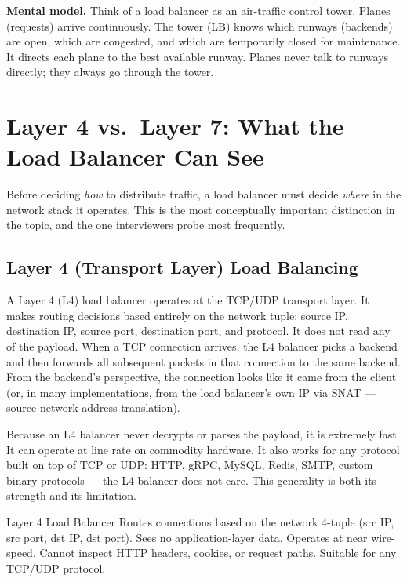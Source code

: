 \documentclass[11pt,a4paper]{article}
\begin{document}
\begin{insightbox}
  \textbf{Mental model.} Think of a load balancer as an air-traffic control tower. Planes
  (requests) arrive continuously. The tower (LB) knows which runways (backends) are open,
  which are congested, and which are temporarily closed for maintenance. It directs each
  plane to the best available runway. Planes never talk to runways directly; they always go
  through the tower.
\end{insightbox}

\section{Layer 4 vs.\ Layer 7: What the Load Balancer Can See}

Before deciding \emph{how} to distribute traffic, a load balancer must decide \emph{where} in the
network stack it operates. This is the most conceptually important distinction in the topic, and the
one interviewers probe most frequently.

\subsection{Layer 4 (Transport Layer) Load Balancing}

A Layer 4 (L4) load balancer operates at the TCP/UDP transport layer. It makes routing decisions
based entirely on the network tuple: source IP, destination IP, source port, destination port, and
protocol. It does not read any of the payload. When a TCP connection arrives, the L4 balancer picks
a backend and then forwards all subsequent packets in that connection to the same backend. From the
backend's perspective, the connection looks like it came from the client (or, in many implementations,
from the load balancer's own IP via SNAT --- source network address translation).

Because an L4 balancer never decrypts or parses the payload, it is extremely fast. It can operate
at line rate on commodity hardware. It also works for any protocol built on top of TCP or UDP:
HTTP, gRPC, MySQL, Redis, SMTP, custom binary protocols --- the L4 balancer does not care. This
generality is both its strength and its limitation.

\begin{termbox}{Layer 4 Load Balancer}
  Routes connections based on the network 4-tuple (src IP, src port, dst IP, dst port). Sees no
  application-layer data. Operates at near wire-speed. Cannot inspect HTTP headers, cookies, or
  request paths. Suitable for any TCP/UDP protocol.
\end{termbox}
\end{document}
